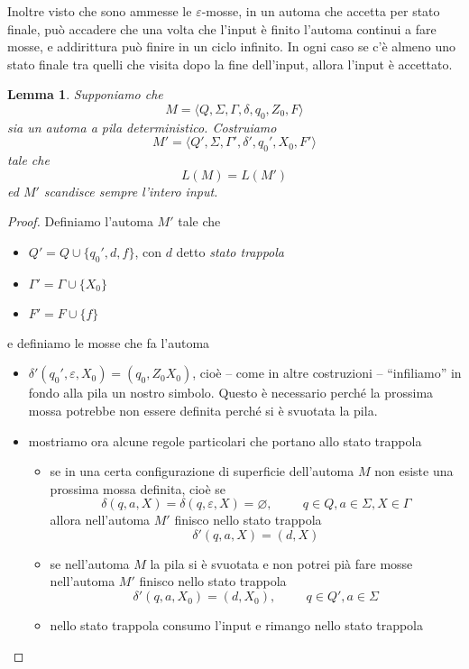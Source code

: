 \documentclass[12pt]{article}
\newtheorem{lemma}{Lemma}
\begin{document}
Inoltre visto che sono ammesse le $\varepsilon$-mosse, in un automa che accetta per stato finale, può accadere che una volta che l'input è finito l'automa continui a fare mosse, e addirittura può finire in un ciclo infinito.
In ogni caso se c'è almeno uno stato finale tra quelli che visita dopo la fine dell'input, allora l'input è accettato.

\begin{lemma}
	Supponiamo che
	$$ M = \langle Q, \Sigma, \Gamma, \delta, q_0, Z_0, F \rangle $$
	sia un automa a pila deterministico.
	Costruiamo 
	$$ M' = \langle Q', \Sigma, \Gamma', \delta', q_0', X_0, F' \rangle $$
	tale che
	$$ L(M) = L(M') $$
	ed $M'$ scandisce sempre l'intero input.
\end{lemma}
\begin{proof}
	Definiamo l'automa $M'$ tale che
	\begin{itemize}
		\item $Q' = Q \cup \{q_0', d, f \}$, con $d$ detto \textit{stato trappola}
		\item $\Gamma' = \Gamma \cup \{X_0\} $
		\item $F' = F \cup \{ f \} $
	\end{itemize}
	e definiamo le mosse che fa l'automa
	\begin{itemize}
		\item $\delta'(q_0', \varepsilon, X_0) = (q_0, Z_0X_0)$, cioè -- come in altre costruzioni -- ``infiliamo'' in fondo alla pila un nostro simbolo.
			Questo è necessario perché la prossima mossa potrebbe non essere definita perché si è svuotata la pila.
		\item mostriamo ora alcune regole particolari che portano allo stato trappola
			\begin{itemize}
				\item se in una certa configurazione di superficie dell'automa $M$ non esiste una prossima mossa definita, cioè se
					$$\delta(q, a, X) = \delta(q, \varepsilon, X) = \varnothing, \hspace{1cm} q \in Q, a \in \Sigma, X \in \Gamma$$
					allora nell'automa $M'$ finisco nello stato trappola
					$$\delta'(q, a, X) = (d, X)$$
				\item se nell'automa $M$ la pila si è svuotata e non potrei pià fare mosse nell'automa $M'$ finisco nello stato trappola
					$$\delta'(q, a, X_0) = (d, X_0),\hspace{1cm}q \in Q', a \in \Sigma$$
				\item nello stato trappola consumo l'input e rimango nello stato trappola

\end{itemize}
\end{itemize}
\end{proof}
\end{document}
